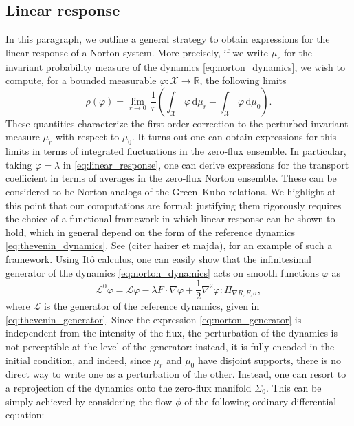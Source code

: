 \documentclass[pdflatex,sn-mathphys]{sn-jnl}%
\theoremstyle{thmstyleone}%
\theoremstyle{thmstyletwo}%
\theoremstyle{thmstylethree}%
\renewcommand{\d}{\mathrm{d}}
\newcommand{\cL}{\mathcal{L}}
\newcommand{\1}{\mathbbm{1}}
\begin{document}
\subsection{Linear response}
In this paragraph, we outline a general strategy to obtain expressions for the linear response of a Norton system. More precisely, if we write $\mu_r$ for the invariant probability measure of the dynamics \eqref{eq:norton_dynamics}, we wish to compute, for a bounded measurable $\varphi : \mathcal X \to \mathbb{R}$, the following limits
\begin{equation}
    \label{eq:linear_response}
    \rho(\varphi)=\underset{r\to 0}{\lim}\,\frac1r\left(\int_{\mathcal X} \varphi\, \d\mu_r - \int_{\mathcal X} \varphi\,\d\mu_0\right).
\end{equation}
These quantities characterize the first-order correction to the perturbed invariant measure $\mu_r$ with respect to $\mu_0$. It turns out one can obtain expressions for this limits in terms of integrated fluctuations in the zero-flux ensemble. In particular, taking $\varphi = \lambda$ in \eqref{eq:linear_response}, one can derive expressions for the transport coefficient in terms of averages in the zero-flux Norton ensemble. These can be considered to be Norton analogs of the Green--Kubo relations. We highlight at this point that our computations are formal: justifying them rigorously requires the choice of a functional framework in which linear response can be shown to hold, which in general depend on the form of the reference dynamics \eqref{eq:thevenin_dynamics}. See \cite{} (citer hairer et majda), for an example of such a framework.
Using Itô calculus, one can easily show that the infinitesimal generator of the dynamics \eqref{eq:norton_dynamics} acts on smooth functions $\varphi$ as
\begin{equation}
    \label{eq:norton_generator}
    \cL^0 \varphi = \cL \varphi - \lambda F\cdot \nabla \varphi + \frac12 \nabla^2\varphi : \Pi_{\nabla R,F,\sigma},
\end{equation}
where $\cL$ is the generator of the reference dynamics, given in \eqref{eq:thevenin_generator}. Since the expression \eqref{eq:norton_generator} is independent from the intensity of the flux, the perturbation of the dynamics is not perceptible at the level of the generator: instead, it is fully encoded in the initial condition, and indeed, since $\mu_r$ and $\mu_0$ have disjoint supports, there is no direct way to write one as a perturbation of the other. Instead, one can resort to a reprojection of the dynamics onto the zero-flux manifold $\Sigma_0$. This can be simply achieved by considering the flow $\phi$ of the following ordinary differential equation:
\end{document}
